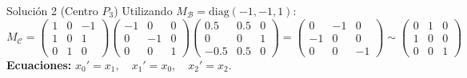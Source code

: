 {Solución 2 (Centro $P_3$)
Utilizando $M_{\mathcal{B}} = \text{diag}(-1, -1, 1)$:
$$ M_{\mathcal{C}} = \begin{pmatrix} 1 & 0 & -1 \\ 1 & 0 & 1 \\ 0 & 1 & 0 \end{pmatrix} \begin{pmatrix} -1 & 0 & 0 \\ 0 & -1 & 0 \\ 0 & 0 & 1 \end{pmatrix} \begin{pmatrix} 0.5 & 0.5 & 0 \\ 0 & 0 & 1 \\ -0.5 & 0.5 & 0 \end{pmatrix} = \begin{pmatrix} 0 & -1 & 0 \\ -1 & 0 & 0 \\ 0 & 0 & -1 \end{pmatrix} \sim \begin{pmatrix} 0 & 1 & 0 \\ 1 & 0 & 0 \\ 0 & 0 & 1 \end{pmatrix} $$
\textbf{Ecuaciones:} $x_0' = x_1, \quad x_1' = x_0, \quad x_2' = x_2$.
}

